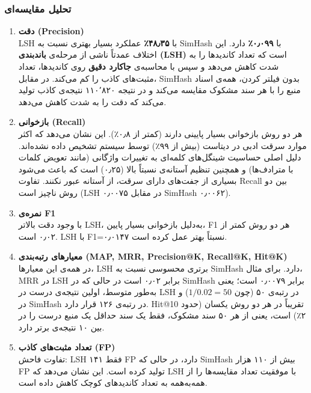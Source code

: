 \documentclass[12pt,a4paper]{article}
\begin{document}
\subsubsection*{تحلیل مقایسه‌ای}

\begin{enumerate}
    \item \textbf{دقت (Precision)} \\
    LSH با \textbf{۴۸٫۳۵٪} عملکرد بسیار بهتری نسبت به SimHash با \textbf{۰٫۰۹۹٪} دارد. این اختلاف عمدتاً ناشی از مرحله‌ی \textbf{باندبندی (LSH)} است که تعداد کاندیدها را به شدت کاهش می‌دهد و سپس با محاسبه‌ی \textbf{جاکارد دقیق} روی کاندیدها، تعداد مثبت‌های کاذب را کم می‌کند. در مقابل، SimHash بدون فیلتر کردن، همه‌ی اسناد منبع را با هر سند مشکوک مقایسه می‌کند و در نتیجه ۱۱۰٬۸۲۰ نتیجه‌ی کاذب تولید می‌کند که دقت را به شدت کاهش می‌دهد.

    \item \textbf{بازخوانی (Recall)} \\
    هر دو روش بازخوانی بسیار پایینی دارند (کمتر از ۰٫۸٪). این نشان می‌دهد که اکثر موارد سرقت ادبی در دیتاست (بیش از ۹۹٪) توسط سیستم تشخیص داده نشده‌اند. دلیل اصلی حساسیت شینگل‌های کلمه‌ای به تغییرات واژگانی (مانند تعویض کلمات با مترادف‌ها) و همچنین تنظیم آستانه‌ی نسبتاً بالا (۰٫۲۵) است که باعث می‌شود بسیاری از جفت‌های دارای سرقت، از آستانه عبور نکنند. تفاوت Recall بین دو روش ناچیز است (LSH ۰٫۰۰۷۵ در مقابل SimHash ۰٫۰۰۶۲).

    \item \textbf{نمره‌ی F1} \\
    با وجود دقت بالاتر LSH، به‌دلیل بازخوانی بسیار پایین، F1 هر دو روش کمتر از ۰٫۰۲ است. LSH با F1=۰٫۰۱۴۷ نسبتاً بهتر عمل کرده است.

    \item \textbf{معیارهای رتبه‌بندی (MAP, MRR, Precision@K, Recall@K, Hit@K)} \\
    در همه‌ی این معیارها، LSH برتری محسوسی نسبت به SimHash دارد. برای مثال، MRR در LSH برابر ۰٫۰۲ است در حالی که در SimHash برابر ۰٫۰۰۷۹ است؛ یعنی به‌طور متوسط، اولین نتیجه‌ی درست در LSH در رتبه‌ی ۵۰ (چون $1/0.02=50$) و در SimHash در رتبه‌ی ۱۲۶ قرار دارد. Hit@10 تقریباً در هر دو روش یکسان (حدود ۲٪) است، یعنی از هر ۵۰ سند مشکوک، فقط یک سند حداقل یک منبع درست را در بین ۱۰ نتیجه‌ی برتر دارد.

    \item \textbf{تعداد مثبت‌های کاذب (FP)} \\
    تفاوت فاحش: LSH فقط ۱۴۱ FP دارد، در حالی که SimHash بیش از ۱۱۰ هزار FP تولید کرده است. این نشان می‌دهد که LSH با موفقیت تعداد مقایسه‌ها را از همه‌به‌همه به تعداد کاندیدهای کوچک کاهش داده است.
\end{enumerate}
\end{document}
